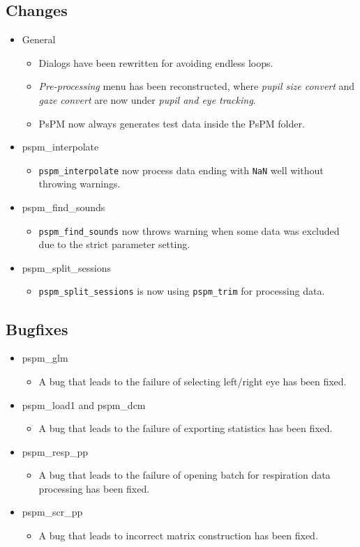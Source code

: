\documentclass[english]{article}
\numberwithin{equation}{section}
\numberwithin{figure}{section}
\begin{document}
\subsection*{Changes}
\begin{itemize}
\item General
\begin{itemize}
\item Dialogs have been rewritten for avoiding endless loops.
\item \textit{Pre-processing} menu has been reconstructed, where \textit{pupil
size convert} and \textit{gaze convert} are now under \textit{pupil
and eye tracking}.
\item PsPM now always generates test data inside the PsPM folder.
\end{itemize}
\item pspm\_interpolate
\begin{itemize}
\item \texttt{pspm\_interpolate} now process data ending with \texttt{NaN}
well without throwing warnings.
\end{itemize}
\item pspm\_find\_sounds
\begin{itemize}
\item \texttt{pspm\_find\_sounds} now throws warning when some data was
excluded due to the strict parameter setting.
\end{itemize}
\item pspm\_split\_sessions
\begin{itemize}
\item \texttt{pspm\_split\_sessions} is now using \texttt{pspm\_trim} for
processing data.
\end{itemize}
\end{itemize}

\subsection*{Bugfixes}
\begin{itemize}
\item pspm\_glm
\begin{itemize}
\item A bug that leads to the failure of selecting left/right eye has been fixed.
\end{itemize}
\item pspm\_load1 and pspm\_dcm
\begin{itemize}
\item A bug that leads to the failure of exporting statistics has been fixed.
\end{itemize}
\item pspm\_resp\_pp
\begin{itemize}
\item A bug that leads to the failure of opening batch for respiration data
processing has been fixed.
\end{itemize}
\item pspm\_scr\_pp
\begin{itemize}
\item A bug that leads to incorrect matrix construction has been fixed.
\end{itemize}
\end{itemize}
\end{document}

